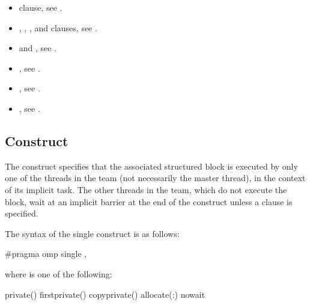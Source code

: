 \crossreferences
\begin{itemize}
\item {} clause, see
.

\item {}, , , and 
 clauses, see .

\item {} and , see
  .

\item {}, see .

\item {}, see
.

\item {}, see 
.

\end{itemize}



\subsection{ Construct}
\label{subsec:single Construct}
\summary
The  construct specifies that the associated structured block is 
executed by only one of the threads in the team (not necessarily the master 
thread), in the context of its implicit task. The other threads in the team, 
which do not execute the block, wait at an implicit barrier at the end of the 
 construct unless a  clause is specified.

\syntax
\begin{ccppspecific}
The syntax of the single construct is as follows:

\begin{ompcPragma}
#pragma omp single \plc{[clause[ [},\plc{] clause] ... ] new-line}
\end{ompcPragma}

\begin{samepage}
where  is one of the following:

\begin{indentedcodelist}
private()
firstprivate()
copyprivate()
allocate(\plc{[allocator }:\plc{] list})
nowait
\end{indentedcodelist}
\end{samepage}
\end{ccppspecific}

